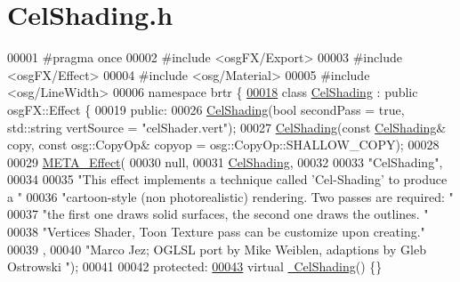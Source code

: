 \hypertarget{_cel_shading_8h_source}{\section{Cel\+Shading.\+h}
\label{_cel_shading_8h_source}
}

\begin{DoxyCode}
00001 \textcolor{preprocessor}{#pragma once}
00002 \textcolor{preprocessor}{#include <osgFX/Export>}
00003 \textcolor{preprocessor}{#include <osgFX/Effect>}
00004 \textcolor{preprocessor}{#include <osg/Material>}
00005 \textcolor{preprocessor}{#include <osg/LineWidth>}
00006 \textcolor{keyword}{namespace }brtr \{
\hypertarget{_cel_shading_8h_source_l00018}{}\hyperlink{classbrtr_1_1_cel_shading}{00018}     \textcolor{keyword}{class }\hyperlink{classbrtr_1_1_cel_shading}{CelShading} : \textcolor{keyword}{public} osgFX::Effect \{
00019     \textcolor{keyword}{public}:
00026         \hyperlink{classbrtr_1_1_cel_shading_ae497a14c2c379b608643d8f39d156b52}{CelShading}(\textcolor{keywordtype}{bool} secondPass = \textcolor{keyword}{true}, std::string vertSource = \textcolor{stringliteral}{"celShader.vert"});
00027         \hyperlink{classbrtr_1_1_cel_shading_ae497a14c2c379b608643d8f39d156b52}{CelShading}(\textcolor{keyword}{const} \hyperlink{classbrtr_1_1_cel_shading}{CelShading}& copy, \textcolor{keyword}{const} osg::CopyOp& copyop = 
      osg::CopyOp::SHALLOW\_COPY);
00028 
00029         \hyperlink{classbrtr_1_1_cel_shading_a02ab424cf06935b9560b5c39d733d02c}{META\_Effect}(
00030             null,
00031             \hyperlink{classbrtr_1_1_cel_shading}{CelShading},
00032 
00033             \textcolor{stringliteral}{"CelShading"},
00034 
00035             \textcolor{stringliteral}{"This effect implements a technique called 'Cel-Shading' to produce a "}
00036             \textcolor{stringliteral}{"cartoon-style (non photorealistic) rendering. Two passes are required: "}
00037             \textcolor{stringliteral}{"the first one draws solid surfaces, the second one draws the outlines. "}
00038             \textcolor{stringliteral}{"Vertices Shader, Toon Texture pass can be customize upon creating."}
00039              ,
00040             \textcolor{stringliteral}{"Marco Jez; OGLSL port by Mike Weiblen, adaptions by Gleb Ostrowski "});
00041 
00042     \textcolor{keyword}{protected}:
\hypertarget{_cel_shading_8h_source_l00043}{}\hyperlink{classbrtr_1_1_cel_shading_ab6148e389081719d56d2971cc8924841}{00043}         \textcolor{keyword}{virtual} \hyperlink{classbrtr_1_1_cel_shading_ab6148e389081719d56d2971cc8924841}{~CelShading}() \{\}

\end{DoxyCode}
